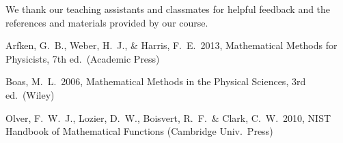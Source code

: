 \documentclass{article}
\begin{document}
\acknowledgments
We thank our teaching assistants and classmates for helpful feedback and 
the references and materials provided by our course.

\begin{thebibliography}{}

  Arfken, G.\ B., Weber, H.\ J., \& Harris, F.\ E.\ 2013, 
  Mathematical Methods for Physicists, 7th ed.\ (Academic Press)

  Boas, M.\ L.\ 2006, Mathematical Methods in the Physical Sciences, 3rd ed.\ 
  (Wiley)

  Olver, F.\ W.\ J., Lozier, D.\ W., Boisvert, R.\ F.\, \& Clark, C.\ W.\ 2010, 
  NIST Handbook of Mathematical Functions (Cambridge Univ.\ Press)

\end{thebibliography}
\end{document}
